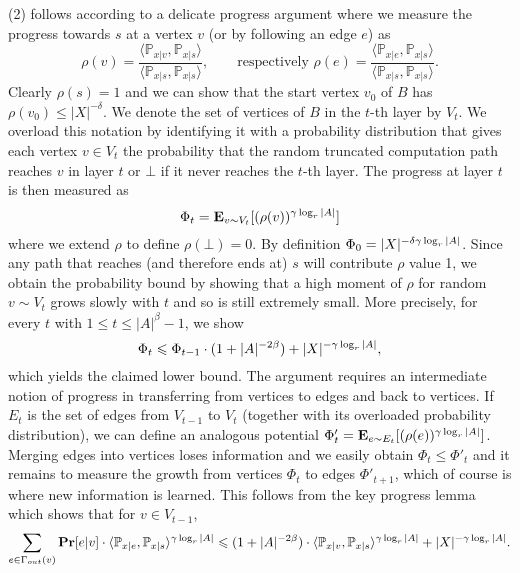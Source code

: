 (2) follows according to a delicate progress argument where we
measure the progress
towards $s$ at a vertex $v$ (or by following an edge $e$) as
\begin{equation}
\rho(v)=\frac{\langle \mathbb{P}_{x|v},\mathbb{P}_{x|s}\rangle}{\langle \mathbb{P}_{x|s},\mathbb{P}_{x|s}\rangle},\qquad\mbox{respectively }
\rho(e)=\frac{\langle \mathbb{P}_{x|e},\mathbb{P}_{x|s}\rangle}{\langle \mathbb{P}_{x|s},\mathbb{P}_{x|s}\rangle}.
\end{equation}
Clearly $\rho(s)=1$ and we can show that the start vertex $v_0$ of $B$
has $\rho(v_0)\le |X|^{-\delta }$.
We denote the set of vertices of $B$ in the $t$-th layer by $V_t$. We overload
this notation by identifying it with a probability distribution that gives each
vertex $v\in V_t$ the probability that the random truncated computation path
reaches $v$ in layer $t$ or $\bot$ if it never reaches the $t$-th layer.
The progress at layer $t$ is then measured as
\begin{equation}
\Phi_t={\mathbf E}_{v\sim V_t}[(\rho(v))^{\gamma \log_r |A|}]
\end{equation}
where we extend $\rho$ to define $\rho(\bot)=0$.
By definition $\Phi_0=|X|^{-\delta \gamma\log_r |A|}$.
Since any path that reaches (and therefore ends at) $s$ will contribute $\rho$
value 1, we obtain the probability bound by showing that a high moment of
$\rho$ for random $v\sim V_t$ grows slowly with $t$ and so is still extremely
small.  
More precisely, for every $t$ with $1\le t\le |A|^{\beta }-1$,
we show
\begin{equation}
\Phi_t \leqslant \Phi_{t-1}\cdot(1+|A|^{-2\beta }) +|X|^{-\gamma \log_r |A|},
\end{equation}
which yields the claimed lower bound.
The argument requires an intermediate notion of progress in transferring from
vertices to edges and back to vertices. If $E_t$ is the set of edges from
$V_{t-1}$ to $V_t$ (together with its overloaded probability distribution),
we can define an analogous potential
$\Phi'_t={\mathbf E}_{e\sim E_t}[(\rho(e))^{\gamma \log_r |A|}]$.  Merging edges into
vertices loses information and we easily obtain $\Phi_t\le \Phi'_t$ and it
remains to measure the growth from vertices $\Phi_t$ to edges $\Phi'_{t+1}$,
which of course is where new information is learned.
This follows from the key progress lemma which shows that
for $v\in V_{t-1}$,
\begin{equation}
\sum_{e\in \Gamma_{out}(v)} {\mathbf{Pr}}[e|v]\cdot 
\langle \mathbb{P}_{x|e},\mathbb{P}_{x|s}\rangle^{\gamma \log_r |A|}
\leqslant (1+|A|^{-2\beta })\cdot 
\langle \mathbb{P}_{x|v},\mathbb{P}_{x|s}\rangle^{\gamma \log_r |A|} +|X|^{-\gamma \log_r |A|}.\label{maineqn}
\end{equation}
